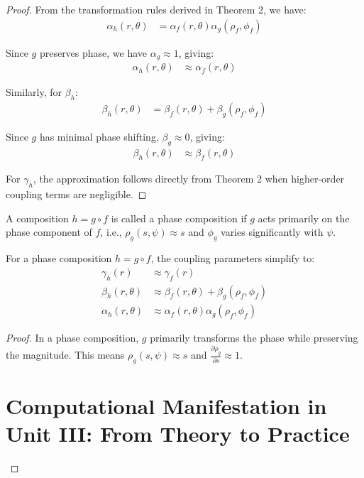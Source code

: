 \begin{definition}
\begin{enumerate}
\begin{definition}
\begin{proof}
From the transformation rules derived in Theorem 2, we have:
\begin{align}
\alpha_h(r,\theta) &= \alpha_f(r,\theta)\alpha_g(\rho_f,\phi_f)
\end{align}

Since $g$ preserves phase, we have $\alpha_g \approx 1$, giving:
\begin{align}
\alpha_h(r,\theta) &\approx \alpha_f(r,\theta)
\end{align}

Similarly, for $\beta_h$:
\begin{align}
\beta_h(r,\theta) &= \beta_f(r,\theta) + \beta_g(\rho_f,\phi_f)
\end{align}

Since $g$ has minimal phase shifting, $\beta_g \approx 0$, giving:
\begin{align}
\beta_h(r,\theta) &\approx \beta_f(r,\theta)
\end{align}

For $\gamma_h$, the approximation follows directly from Theorem 2 when higher-order coupling terms are negligible.
\end{proof}

\begin{definition}
A composition $h = g \circ f$ is called a phase composition if $g$ acts primarily on the phase component of $f$, i.e., $\rho_g(s,\psi) \approx s$ and $\phi_g$ varies significantly with $\psi$.
\end{definition}

\begin{theorem}
For a phase composition $h = g \circ f$, the coupling parameters simplify to:
\begin{align}
\gamma_h(r) &\approx \gamma_f(r)\\
\beta_h(r,\theta) &\approx \beta_f(r,\theta) + \beta_g(\rho_f,\phi_f)\\
\alpha_h(r,\theta) &\approx \alpha_f(r,\theta)\alpha_g(\rho_f,\phi_f)
\end{align}
\end{theorem}

\begin{proof}
In a phase composition, $g$ primarily transforms the phase while preserving the magnitude. This means $\rho_g(s,\psi) \approx s$ and $\frac{\partial \rho_g}{\partial s} \approx 1$.

\section{Computational Manifestation in Unit III: From Theory to Practice}


\end{proof}
\end{definition}
\end{enumerate}
\end{definition}
